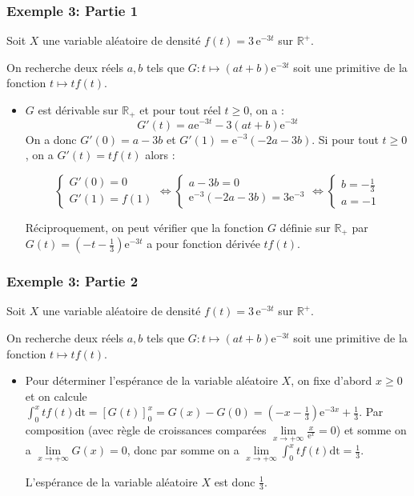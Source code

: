 \documentclass[xcolor=svgnames,t,final]{beamer}
\newcommand{\R}{\mathbb{R}}
\newcommand{\limite}[2]{\lim\limits
_{x \to #1} #2}
\begin{document}
\begin{frame}

\frametitle{Exemple 3: Partie 1}
\label{exemple3}


Soit $X$ une variable aléatoire de densité $f(t)=3\,\text{e}^{ -3t} $ sur $\R^{+}$.

On recherche deux  réels $a, b$ tels que $G: t \mapsto (at+b)\text{e}^{-3t}$ soit une primitive de la fonction $ t \mapsto tf(t)$.


\begin{itemize}
\pause \item $G$ est dérivable sur $\R_{+}$ et pour tout réel $t \geqslant 0$, on a :
$$G'(t)=a\text{e}^{-3t}-3(at+b)\text{e}^{-3t}$$
On a donc $G'(0)=a-3b$ et $G'(1)=\text{e}^{-3}(-2a-3b)$.
Si pour tout $t \geqslant 0$, on a  $G'(t)=tf(t)$ alors :

$$\begin{cases}G'(0)=0 \\ G'(1)=f(1)\end{cases}\Leftrightarrow \begin{cases}a-3b=0 \\\text{e}^{-3}(-2a-3b)=3\text{e}^{-3}\end{cases}\Leftrightarrow \begin{cases}b =-\frac{1}{3} \\  a =-1 \end{cases}$$

Réciproquement, on peut vérifier que la fonction $G$ définie sur $\R_{+}$  par $G(t)=(-t-\frac{1}{3})\text{e}^{-3t}$ a pour fonction dérivée $tf(t)$.

\end{itemize}

\end{frame}




\begin{frame}

\frametitle{Exemple 3: Partie 2}
\label{exemple3}


Soit $X$ une variable aléatoire de densité $f(t)=3\,\text{e}^{ -3t} $ sur $\R^{+}$.

On recherche deux  réels $a, b$ tels que $G: t \mapsto (at+b)\text{e}^{-3t}$ soit une primitive de la fonction $ t \mapsto tf(t)$.


\begin{itemize}

\pause \item Pour déterminer l'espérance de la variable aléatoire $X$, on fixe d'abord $x \geqslant 0$ et on calcule $\int_{0}^{x}tf(t)\text{dt}=\left[G(t)\right]_{0}^{x}=G(x)-G(0)=(-x-\frac{1}{3})\text{e}^{-3x} + \frac{1}{3}$.
Par composition (avec règle de croissances comparées $\limite{+\infty}{\frac{x}{\text{e}^{x}}}=0$) et somme on a $\limite{+\infty}{G(x)}=0$, donc par somme on a $\limite{+\infty}{\int_{0}^{x}tf(t)\text{dt}}=\frac{1}{3}$.

L'espérance de la variable aléatoire $X$ est donc $\frac{1}{3}$.
\end{itemize}

\end{frame}
\end{document}
